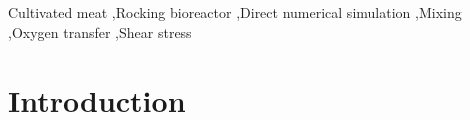 \documentclass[final,3p,times,twocolumn,authoryear]{elsarticle}
\theoremstyle{definition}
\begin{document}
\begin{frontmatter}




\begin{keyword}

Cultivated meat \sep Rocking bioreactor \sep Direct numerical simulation \sep Mixing \sep Oxygen transfer \sep Shear stress
\end{keyword}

\end{frontmatter}



\section{Introduction} \label{sec:intro}
\end{document}
